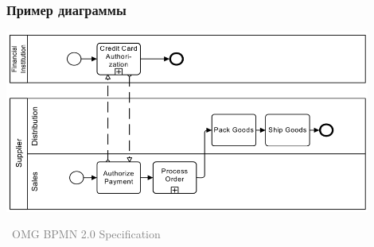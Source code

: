 \documentclass[xetex,mathserif,serif]{beamer}
\newcommand{\attribution}[1] {
    \vspace{-5mm}\begin{flushright}\begin{scriptsize}\textcolor{gray}{\textcopyright\, #1}\end{scriptsize}\end{flushright}
}
\begin{document}
    \begin{frame}
        \frametitle{Пример диаграммы}
        \begin{center}
            \includegraphics[width=0.9\textwidth]{bpmnExample.png}
            \attribution{OMG BPMN 2.0 Specification}
        \end{center}
    \end{frame}
\end{document}
